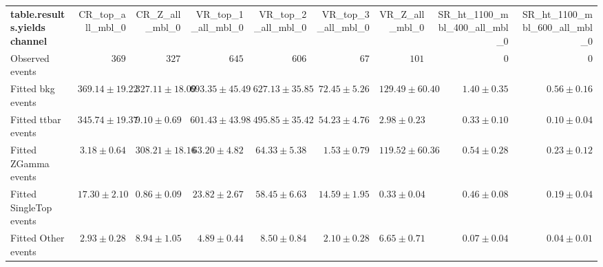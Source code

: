 

\begin{table}
\begin{center}
\setlength{\tabcolsep}{0.0pc}
{\small
\begin{tabular*}{\textwidth}{@{\extracolsep{\fill}}lrrrrrrrr}
\noalign{\smallskip}\hline\noalign{\smallskip}
{\bf table.results.yields channel}           & CR\_top\_all\_mbl\_0            & CR\_Z\_all\_mbl\_0            & VR\_top\_1\_all\_mbl\_0            & VR\_top\_2\_all\_mbl\_0            & VR\_top\_3\_all\_mbl\_0            & VR\_Z\_all\_mbl\_0            & SR\_ht\_1100\_mbl\_400\_all\_mbl\_0            & SR\_ht\_1100\_mbl\_600\_all\_mbl\_0              \\[-0.05cm]
\noalign{\smallskip}\hline\noalign{\smallskip}
Observed events          & $369$              & $327$              & $645$              & $606$              & $67$              & $101$              & $0$              & $0$                    \\
\noalign{\smallskip}\hline\noalign{\smallskip}
Fitted bkg events         & $369.14 \pm 19.22$          & $327.11 \pm 18.09$          & $693.35 \pm 45.49$          & $627.13 \pm 35.85$          & $72.45 \pm 5.26$          & $129.49 \pm 60.40$          & $1.40 \pm 0.35$          & $0.56 \pm 0.16$              \\
\noalign{\smallskip}\hline\noalign{\smallskip}
        Fitted ttbar events         & $345.74 \pm 19.37$          & $9.10 \pm 0.69$          & $601.43 \pm 43.98$          & $495.85 \pm 35.42$          & $54.23 \pm 4.76$          & $2.98 \pm 0.23$          & $0.33 \pm 0.10$          & $0.10 \pm 0.04$              \\
        Fitted ZGamma events         & $3.18 \pm 0.64$          & $308.21 \pm 18.16$          & $63.20 \pm 4.82$          & $64.33 \pm 5.38$          & $1.53 \pm 0.79$          & $119.52 \pm 60.36$          & $0.54 \pm 0.28$          & $0.23 \pm 0.12$              \\
        Fitted SingleTop events         & $17.30 \pm 2.10$          & $0.86 \pm 0.09$          & $23.82 \pm 2.67$          & $58.45 \pm 6.63$          & $14.59 \pm 1.95$          & $0.33 \pm 0.04$          & $0.46 \pm 0.08$          & $0.19 \pm 0.04$              \\
        Fitted Other events         & $2.93 \pm 0.28$          & $8.94 \pm 1.05$          & $4.89 \pm 0.44$          & $8.50 \pm 0.84$          & $2.10 \pm 0.28$          & $6.65 \pm 0.71$          & $0.07 \pm 0.04$          & $0.04 \pm 0.01$              \\

\end{tabular*}}
\end{center}
\end{table}
